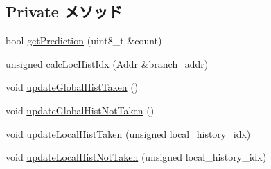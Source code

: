 \subsection*{Private メソッド}
\begin{DoxyCompactItemize}
\item 
bool \hyperlink{classTournamentBP_ad0f11a4da5ded93ef111f9d8a1d40a54}{getPrediction} (uint8\_\-t \&count)
\item 
unsigned \hyperlink{classTournamentBP_ae93fe8c8e3b6835f6fe2489f56600258}{calcLocHistIdx} (\hyperlink{base_2types_8hh_af1bb03d6a4ee096394a6749f0a169232}{Addr} \&branch\_\-addr)
\item 
void \hyperlink{classTournamentBP_a134f4849d0956d21b8d179d9cc4d5484}{updateGlobalHistTaken} ()
\item 
void \hyperlink{classTournamentBP_aa8baf2d471498ae49654c3398d7b1f1f}{updateGlobalHistNotTaken} ()
\item 
void \hyperlink{classTournamentBP_a4f9579428ce30b76c76e2c6bdc876672}{updateLocalHistTaken} (unsigned local\_\-history\_\-idx)
\item 
void \hyperlink{classTournamentBP_a7be8a3b2838c05c1199ae3490e0c4a31}{updateLocalHistNotTaken} (unsigned local\_\-history\_\-idx)
\end{DoxyCompactItemize}
